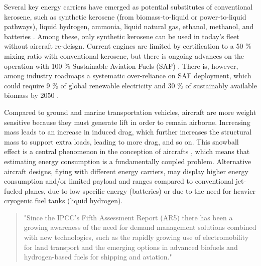 \documentclass[a4paper,fleqn]{cas-dc}
\begin{document}
Several key energy carriers have emerged as potential substitutes of conventional kerosene, such as synthetic kerosene (from biomass-to-liquid or power-to-liquid pathways), liquid hydrogen, ammonia, liquid natural gas, ethanol, methanol, and batteries \cite{ansell_review_2023}. Among these, only synthetic kerosene can be used in today’s fleet without aircraft re-deisgn. Current engines are limited by certification to a 50 \% mixing ratio with conventional kerosene, but there is ongoing advances on the operation with 100 \% Sustainable Aviation Fuels (SAF) \cite{full-saf}. There is, however, among industry roadmaps a systematic over-reliance on SAF deployment, which could require 9 \% of global renewable electricity and 30 \% of sustainably available biomass by 2050 \cite{becken_implications_2023}.

Compared to ground and marine transportation vehicles, aircraft are more weight sensitive because they must generate lift in order to remain airborne. Increasing mass leads to an increase in induced drag, which further increases the structural mass to support extra loads, leading to more drag, and so on. This snowball effect is a central phenomenon in the conception of aircrafts \cite{raymer_aircraft_2018}, which means that estimating energy consumption is a fundamentally coupled problem. Alternative aircraft designs, flying with different energy carriers, may display higher energy consumption and/or limited payload and ranges compared to conventional jet-fueled planes, due to low specific energy (batteries) or due to the need for heavier cryogenic fuel tanks (liquid hydrogen).


\begin{quote}
    "Since the IPCC’s Fifth Assessment Report (AR5) there has been a growing awareness of the need for demand management solutions combined with new technologies, such as the rapidly growing use of electromobility for land transport and the emerging options in advanced biofuels and hydrogen-based fuels for shipping and aviation." \cite[][Executive Summary]{transport_ar6_wg3}
\end{quote}
\end{document}
